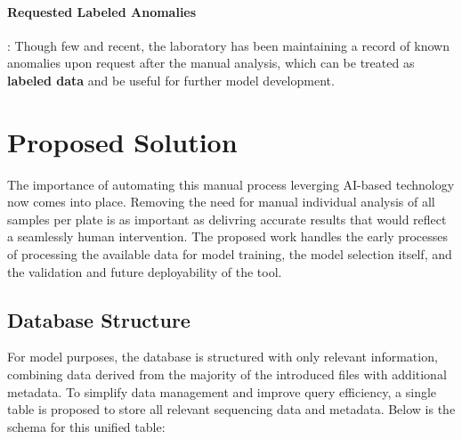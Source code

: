 \paragraph{Requested Labeled Anomalies}: Though few and recent, the laboratory has been maintaining a record of known anomalies upon request after the manual analysis, which can be treated as \textbf{labeled data} and be useful for further model development.

\section{Proposed Solution}
\label{sec:model}

The importance of automating this manual process leverging AI-based technology now comes into place. Removing the need for manual individual analysis of all samples per plate is as important as delivring accurate results that would reflect a seamlessly human intervention.
The proposed work handles the early processes of processing the available data for model training, the model selection itself, and the validation and future deployability of the tool.

\subsection{Database Structure}
For model purposes, the database is structured with only relevant information, combining data derived from the majority of the introduced files with additional metadata. To simplify data management and improve query efficiency, a single table is proposed to store all relevant sequencing data and metadata. Below is the schema for this unified table:

